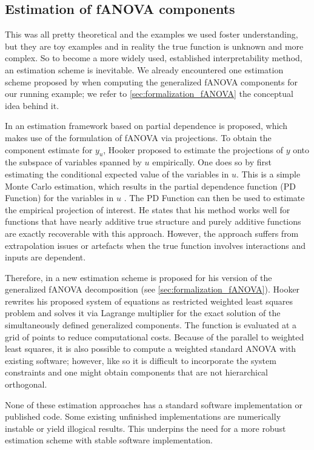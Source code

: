 \subsection{Estimation of fANOVA components}
This was all pretty theoretical and the examples we used foster understanding, but they are toy examples and in reality the true function is unknown and more complex. So to become a more widely used, established interpretability method, an estimation scheme is inevitable.
We already encountered one estimation scheme proposed by \cite{rahman2014} when computing the generalized fANOVA components for our running example; we refer to \autoref{sec:formalization_fANOVA} the conceptual idea behind it.

In \cite{hooker2004} an estimation framework based on partial dependence is proposed, which makes use of the formulation of fANOVA via projections. To obtain the component estimate for $y_u$, Hooker proposed to estimate the projections of $y$ onto the subspace of variables spanned by $u$ empirically.
One does so by first estimating the conditional expected value of the variables in $u$. %
This is a simple Monte Carlo estimation, which results in the partial dependence function (PD Function) for the variables in $u$ \citep{hooker2004}.
The PD Function can then be used to estimate the empirical projection of interest. He states that his method works well for functions that have nearly additive true structure and purely additive functions are exactly recoverable with this approach. However, the approach suffers from extrapolation issues or artefacts when the true function involves interactions and inputs are dependent.\par


Therefore, in \cite{hooker2007} a new estimation scheme is proposed for his version of the generalized fANOVA decomposition (see \autoref{sec:formalization_fANOVA}).
Hooker rewrites his proposed system of equations as restricted weighted least squares problem and solves it via Lagrange multiplier for the exact solution of the simultaneously defined generalized components.
The function is evaluated at a grid of points to reduce computational costs.
Because of the parallel to weighted least squares, it is also possible to compute a weighted standard ANOVA with existing software; however, like so it is difficult to incorporate the system constraints and one might obtain components that are not hierarchical orthogonal.\par

None of these estimation approaches has a standard software implementation or published code.
Some existing unfinished implementations are numerically instable or yield illogical results. This underpins the need for a more robust estimation scheme with stable software implementation.
